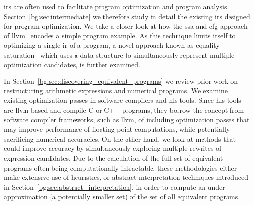 \Glspl{ir} are often used to facilitate program optimization and program
analysis.  Section~\ref{bg:sec:intermediate} we therefore study in detail
the existing \glspl{ir} designed for program optimization.  We take a closer
look at how the \gls{ssa} and \gls{cfg} approach of \gls{llvm}~\cite{llvm_ir}
encodes a simple program example.  As this technique limits itself to
optimizing a single \gls{ir} of a program, a novel approach known as equality
saturation~\cite{tate09} which uses a data structure to simultaneously
represent multiple optimization candidates, is further examined.

In Section~\ref{bg:sec:discovering_equivalent_programs} we review prior
work on restructuring arithmetic expressions and numerical programs.  We
examine existing optimization passes in software compilers and \gls{hls}
tools.  Since \gls{hls} tools are \gls{llvm}-based and compile C or C++
programs, they borrow the concept from software compiler frameworks, such as
\gls{llvm}, of including optimization passes that may improve performance
of floating-point computations, while potentially sacrificing numerical
accuracies.  On the other hand, we look at methods that could improve
accuracy by simultaneously exploring multiple rewrites of expression
candidates.  Due to the calculation of the full set of equivalent programs
often being computationally intractable, these methodologies either make
extensive use of heuristics, or abstract interpretation techniques introduced
in Section~\ref{bg:sec:abstract_interpretation}, in order to compute an
under-approximation (a potentially smaller set) of the set of all equivalent
programs.

